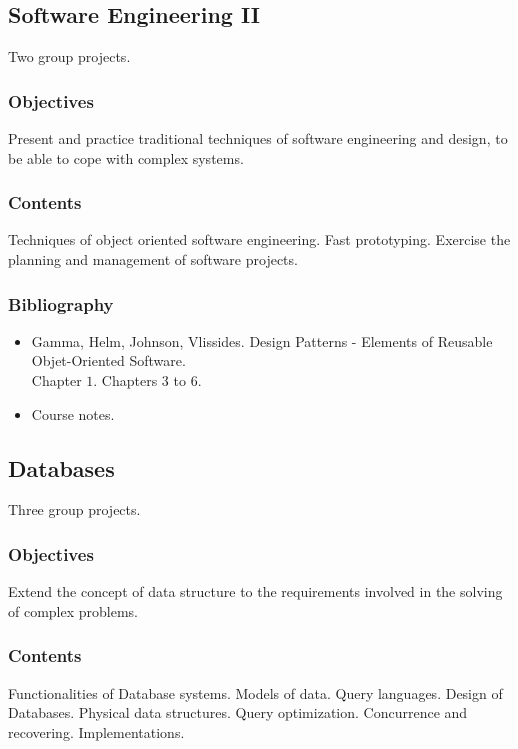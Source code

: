 \documentclass[spanish]{article}
\begin{document}
\hrulefill%

\subsection{Software Engineering II}
Two group projects.

\subsubsection{Objectives}
Present and practice traditional techniques of software engineering and
design, to be able to cope with complex systems.

\subsubsection{Contents}
Techniques of object oriented software engineering. Fast prototyping.
Exercise the planning and management of software projects.

\subsubsection{Bibliography}
\begin{itemize}
  \item Gamma, Helm, Johnson, Vlissides. Design Patterns - Elements of Reusable
    Objet-Oriented Software.\\
    Chapter $1$. Chapters $3$ to $6$.
  \item Course notes.
\end{itemize}


\hrulefill%

\subsection{Databases}
Three group projects.

\subsubsection{Objectives}
Extend the concept of data structure to the requirements involved in the solving
of complex problems.

\subsubsection{Contents}
Functionalities of Database systems. Models of data. Query languages.
Design of Databases. Physical data structures. Query optimization. Concurrence
and recovering. Implementations.
\end{document}
